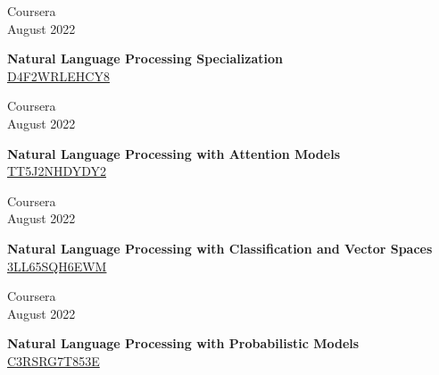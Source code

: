 \documentclass[10pt,a4paper]{article}
\newcommand{\lmpratio}{0.15}
\newcommand{\rmpratio}{0.74}
\newcommand{\horizontalSpace}{0.05\textwidth}
\newcommand{\sectionMain}[1]{\textbf{#1}}
\begin{document}
        \begin{minipage}[t]{\lmpratio\textwidth}
		Coursera\\August 2022
	\end{minipage}
	\hspace{\horizontalSpace}
	\begin{minipage}[t]{\rmpratio\textwidth}
		\sectionMain{Natural Language Processing Specialization}\\
            \href{https://www.coursera.org/account/accomplishments/specialization/certificate/D4F2WRLEHCY8}{D4F2WRLEHCY8}
	\end{minipage}
	\vspace{1cm}

        \begin{minipage}[t]{\lmpratio\textwidth}
		Coursera\\August 2022
	\end{minipage}
	\hspace{\horizontalSpace}
	\begin{minipage}[t]{\rmpratio\textwidth}
		\sectionMain{Natural Language Processing with Attention Models}\\
		\href{https://www.coursera.org/account/accomplishments/certificate/TT5J2NHDYDY2}{TT5J2NHDYDY2}
	\end{minipage}
	\vspace{1cm}

	\begin{minipage}[t]{\lmpratio\textwidth}
		Coursera\\August 2022
	\end{minipage}
	\hspace{\horizontalSpace}
	\begin{minipage}[t]{\rmpratio\textwidth}
		\sectionMain{Natural Language Processing with Classification and Vector Spaces}\\
		\href{https://www.coursera.org/account/accomplishments/certificate/3LL65SQH6EWM}{3LL65SQH6EWM}
	\end{minipage}
	\vspace{1cm}

	\begin{minipage}[t]{\lmpratio\textwidth}
		Coursera\\August 2022
	\end{minipage}
	\hspace{\horizontalSpace}
	\begin{minipage}[t]{\rmpratio\textwidth}
		\sectionMain{Natural Language Processing with Probabilistic Models}\\
		\href{https://www.coursera.org/account/accomplishments/certificate/C3RSRG7T853E}{C3RSRG7T853E}
	\end{minipage}
	\vspace{1cm}
	
\end{document}
